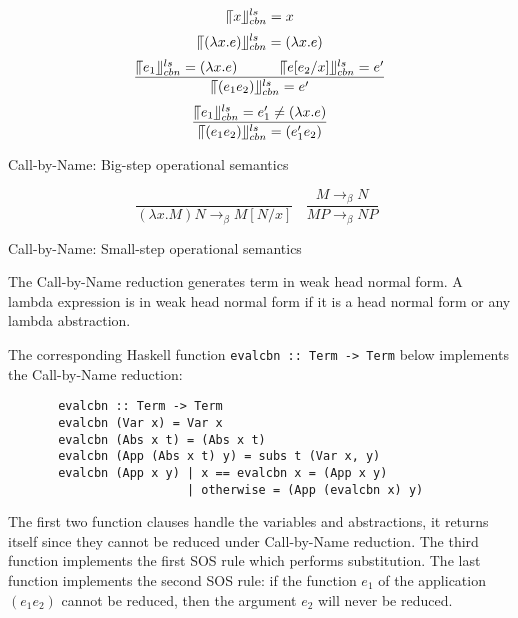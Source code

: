 \begin{equation*}
\llceil x \rrfloor ^{ls} _{cbn} = x
\end{equation*}
\begin{equation*}
\llceil (\lambda x.e) \rrfloor ^{ls} _{cbn} = (\lambda x.e)
\end{equation*}
\begin{equation*}
\frac{\llceil e_1 \rrfloor ^{ls} _{cbn} = (\lambda x.e)\ \ \ \ \ \ \ \ \ \llceil e[e_2/x] \rrfloor ^{ls} _{cbn} = e'}{\llceil (e_1e_2) \rrfloor ^{ls} _{cbn} = e'}
\end{equation*}
\begin{equation*}
\frac{\llceil e_1 \rrfloor ^{ls} _{cbn} = e'_1\neq (\lambda x.e)}{\llceil (e_1e_2) \rrfloor ^{ls} _{cbn} = (e'_1e_2)}
\end{equation*}
\begin{center}
Call-by-Name: Big-step operational semantics
\end{center}

\begin{equation*}
\frac{}{(\lambda x.M)N \rightarrow _\beta M[N/x]}\ \ \ \  
\frac{M \rightarrow _\beta N}{MP \rightarrow _\beta NP}\ \ 
\end{equation*}
\begin{center}
Call-by-Name: Small-step operational semantics
\end{center}

The Call-by-Name reduction generates term in weak head normal form. A lambda expression is in weak head normal form if it is a head normal form or any lambda abstraction. 


The corresponding Haskell function \verb|evalcbn :: Term -> Term| below implements the Call-by-Name reduction:

\begin{verbatim}
       evalcbn :: Term -> Term
       evalcbn (Var x) = Var x
       evalcbn (Abs x t) = (Abs x t)
       evalcbn (App (Abs x t) y) = subs t (Var x, y)
       evalcbn (App x y) | x == evalcbn x = (App x y)
	                     | otherwise = (App (evalcbn x) y) 
\end{verbatim}


The first two function clauses handle the variables and abstractions, it returns itself since they cannot be reduced under Call-by-Name reduction. The third function implements the first SOS rule which performs substitution. The last function implements the second SOS rule: if the function $e_1$ of the application $(e_1e_2)$ cannot be reduced, then the argument $e_2$ will never be reduced. 

